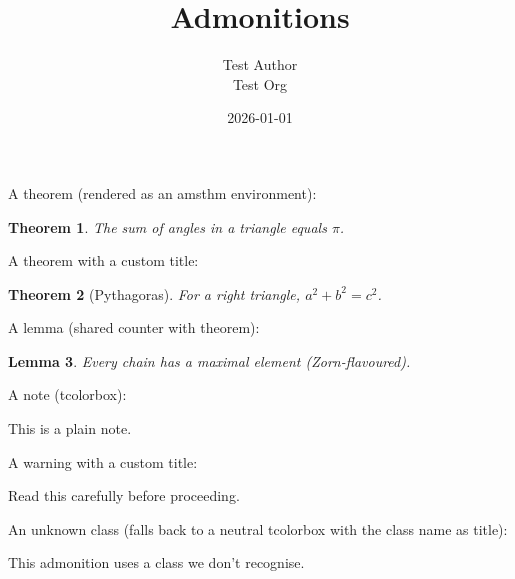 \documentclass[11pt,a4paper]{article}
\title{Admonitions}
\author{Test Author \\ Test Org}
\date{2026-01-01}
\newtheorem{theorem}{Theorem}
\newtheorem{lemma}[theorem]{Lemma}
\theoremstyle{definition}
\begin{document}
\maketitle

A theorem (rendered as an amsthm environment):


\begin{theorem}
The sum of angles in a triangle equals $\pi$.
\end{theorem}


A theorem with a custom title:


\begin{theorem}[Pythagoras]
For a right triangle, $a^2 + b^2 = c^2$.
\end{theorem}


A lemma (shared counter with theorem):


\begin{lemma}
Every chain has a maximal element (Zorn-flavoured).
\end{lemma}


A note (tcolorbox):


\begin{tcolorbox}[breakable, colback=blue!5, colframe=blue!60, title=Note]
This is a plain note.
\end{tcolorbox}


A warning with a custom title:


\begin{tcolorbox}[breakable, colback=orange!5, colframe=orange!70, title=À lire avant tout]
Read this carefully before proceeding.
\end{tcolorbox}


An unknown class (falls back to a neutral tcolorbox with the class name as title):


\begin{tcolorbox}[breakable, colback=gray!5, colframe=gray!50, title=Unknown-class]
This admonition uses a class we don't recognise.
\end{tcolorbox}
\end{document}

